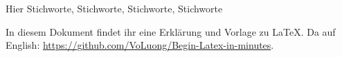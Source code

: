 \thispagestyle{empty}

 \sTitle

 Hier Stichworte, Stichworte, Stichworte, Stichworte

In diesem Dokument findet ihr eine Erklärung und Vorlage zu LaTeX. Da auf English: \url{https://github.com/VoLuong/Begin-Latex-in-minutes}.
